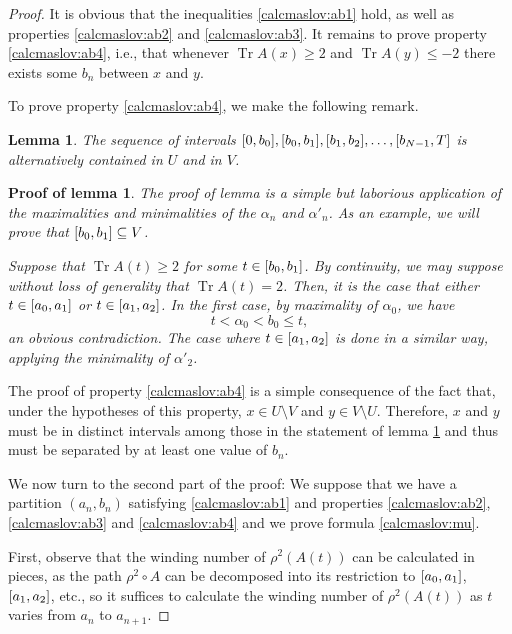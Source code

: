 \documentclass{article}
\newtheorem{lemma}{Lemma}
\theoremstyle{nonumberplain}
\newtheorem{proof}{Proof}
\newtheorem{lemmaproof}{Proof of lemma}
\DeclareMathOperator{\trace}{Tr}
\begin{document}
\begin{proof}
It is obvious that the inequalities \eqref{calcmaslov:ab1} hold, as well as properties \ref{calcmaslov:ab2} and \ref{calcmaslov:ab3}. It remains to prove property \ref{calcmaslov:ab4}, i.e., that whenever $\trace A(x) \geq 2$ and $\trace A(y) \leq -2$ there exists some $b_n$ between $x$ and $y$.

To prove property \ref{calcmaslov:ab4}, we make the following remark.
\begin{lemma}\label{calcmaslov:lemma1}
The sequence of intervals $\interval 0 {b_0}, \interval {b_0}{b_1}, \interval{b_1}{b_2}, \dots, \interval{b_{N-1}}T$ is alternatively contained in $U$ and in $V$.
\end{lemma}

\begin{lemmaproof}
The proof of lemma \label{calcmaslov:lemma1} is a simple but laborious application of the maximalities and minimalities of the $\alpha_n$ and $\alpha'_n$. As an example, we will prove that $\interval{b_0}{b_1} \subseteq V$.

Suppose that $\trace A(t) \geq 2$ for some $t \in \interval{b_0}{b_1}$. By continuity, we may suppose without loss of generality that $\trace A(t) = 2$. Then, it is the case that either $t \in \interval{a_0}{a_1}$ or $t \in \interval{a_1}{a_2}$. In the first case, by maximality of $\alpha_0$, we have
\begin{equation}
t < \alpha_0 < b_0 \leq t,
\end{equation}
an obvious contradiction. The case where $t \in \interval{a_1}{a_2}$ is done in a similar way, applying the minimality of $\alpha'_2$.
\end{lemmaproof}

The proof of property \ref{calcmaslov:ab4} is a simple consequence of the fact that, under the hypotheses of this property, $x \in U \setminus V$ and $y \in V \setminus U$. Therefore, $x$ and $y$ must be in distinct intervals among those in the statement of lemma \ref{calcmaslov:lemma1} and thus must be separated by at least one value of $b_n$.

\smallskip

We now turn to the second part of the proof: We suppose that we have a partition $(a_n, b_n)$ satisfying \eqref{calcmaslov:ab1} and properties \ref{calcmaslov:ab2}, \ref{calcmaslov:ab3} and \ref{calcmaslov:ab4} and we prove formula \eqref{calcmaslov:mu}.

First, observe that the winding number of $\rho^2(A(t))$ can be calculated in pieces, as the path $\rho^2 \circ A$ can be decomposed into its restriction to $\interval{a_0}{a_1}$, $\interval{a_1}{a_2}$, etc., so it suffices to calculate the winding number of $\rho^2(A(t))$ as $t$ varies from $a_n$ to $a_{n+1}$.


\end{proof}
\end{document}

